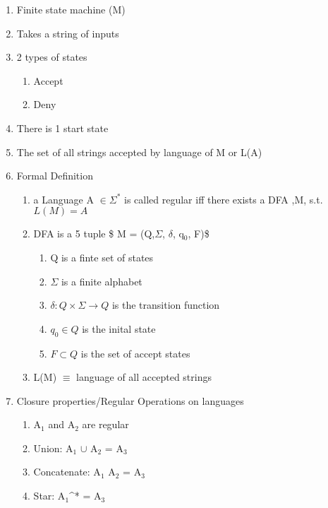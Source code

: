 \documentclass[11pt]{article}
\begin{document}
\begin{enumerate}
\item Finite state machine (M)
\item Takes a string of inputs
\item 2 types of states

\begin{enumerate}
\item Accept
\item Deny
\end{enumerate}

\item There is 1 start state
\item The set of all strings accepted by language of M or L(A)
\item Formal Definition

\begin{enumerate}
\item a Language A $\in \Sigma^*$ is called regular iff there
        exists a DFA ,M, s.t. $L(M) = A$
\item \A DFA is a 5 tuple \$ M = (Q,$\Sigma$, $\delta$, q$_0$, F)\$

\begin{enumerate}
\item Q is a finte set of states
\item $\Sigma$ is a finite alphabet
\item $\delta: Q\times\Sigma \rightarrow Q$ is the transition function
\item $q_0 \in Q$  is the inital state
\item $F \subset Q$ is the set of accept states
\end{enumerate}

\item L(M) $\equiv$ language of all accepted strings
\end{enumerate}

\item Closure properties/Regular Operations on languages

\begin{enumerate}
\item A$_1$ and A$_2$ are regular
\item Union: A$_1$ $\cup$ A$_2$ = A$_3$
\item Concatenate: A$_1$ A$_2$ = A$_3$
\item Star: A$_1$^* = A$_3$
\end{enumerate}

\end{enumerate}
\end{document}
